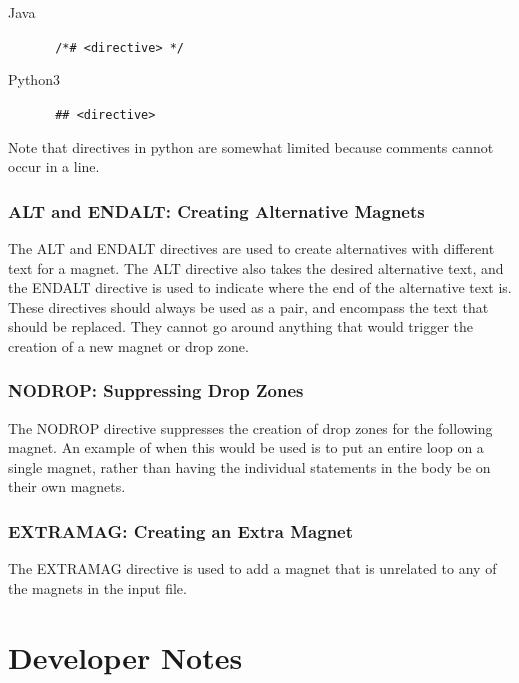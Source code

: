 \documentclass[letter,10pt]{article}
\begin{document}
\begin{description}
 \item [Java] \verb~ /*# <directive> */~
 \item [Python3] \verb~ ## <directive>~
\end{description}



Note that directives in python are somewhat limited because comments 
cannot occur in a line. 

\subsubsection{ALT and ENDALT: Creating Alternative Magnets}

The ALT and ENDALT directives are used to create alternatives with 
different text for a magnet. The ALT directive also takes the desired 
alternative text, and the ENDALT directive is used to indicate where 
the end of the alternative text is. These directives should always be 
used as a pair, and encompass the text that should be replaced. They 
cannot go around anything that would trigger the creation of a new 
magnet or drop zone.


\subsubsection{NODROP: Suppressing Drop Zones}

The NODROP directive suppresses the creation of drop zones for the 
following magnet. An example of when this would be used is to put an 
entire loop on a single magnet, rather than having the individual 
statements in the body be on their own magnets.


\subsubsection{EXTRAMAG: Creating an Extra Magnet}

The EXTRAMAG directive is used to add a magnet that is unrelated to any 
of the magnets in the input file. 



\section{Developer Notes}
\end{document}
